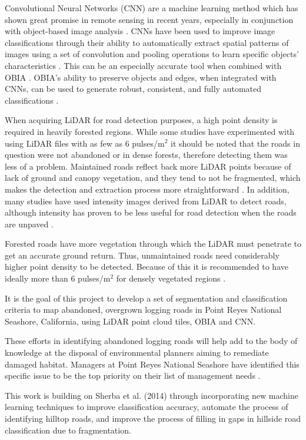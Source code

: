 \documentclass[remotesensing,article,submit,pdftex,moreauthors]{Definitions/mdpi}
\begin{document}
Convolutional Neural Networks (CNN) are a machine learning method which has shown great promise in remote sensing in recent years, especially in conjunction with object-based image analysis \cite{ferreira}. CNNs have been used to improve image classifications through their ability to automatically extract spatial patterns of images using a set of convolution and pooling operations to learn specific objects’ characteristics \cite{zhang}. This can be an especially accurate tool when combined with OBIA \cite{martins}. OBIA’s ability to preserve objects and edges, when integrated with CNNs, can be used to generate robust, consistent, and fully automated classifications \cite{robson}.

When acquiring LiDAR for road detection purposes, a high point density is required in heavily forested regions. While some studies have experimented with using LiDAR files with as few as 6 pulses/m$^2$ \cite{white} it should be noted that the roads in question were not abandoned or in dense forests, therefore detecting them was less of a problem. Maintained roads reflect back more LiDAR points because of lack of ground and canopy vegetation, and they tend to not be fragmented, which makes the detection and extraction process more straightforward \cite{li}. In addition, many studies have used intensity images derived from LiDAR to detect roads, although intensity has proven to be less useful for road detection when the roads are unpaved \cite{yong, white}.  

Forested roads have more vegetation through which the LiDAR must penetrate to get an accurate ground return. Thus, unmaintained roads need considerably higher point density to be detected. Because of this it is recommended to have ideally more than 6 pulses/m$^2$ for densely vegetated regions \cite{sherba}. 

It is the goal of this project to develop a set of segmentation and classification criteria to map abandoned, overgrown logging roads in Point Reyes National Seashore, California, using LiDAR point cloud tiles, OBIA and CNN. 

These efforts in identifying abandoned logging roads will help add to the body of knowledge at the disposal of environmental planners aiming to remediate damaged habitat. Managers at Point Reyes National Seashore have identified this specific issue to be the top   priority on their list of management needs \cite{becker}.

This work is building on Sherba et al. (2014) \cite{sherba} through incorporating new machine learning techniques to improve classification accuracy, automate the process of identifying hilltop roads, and improve the process of filling in gaps in hillside road classification due to fragmentation.
\end{document}
